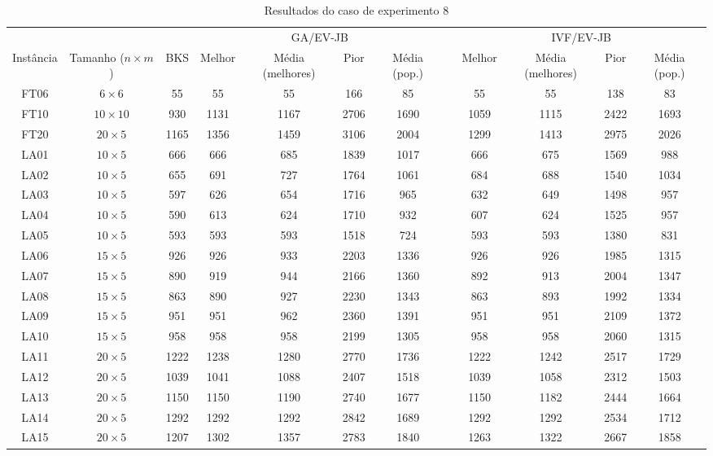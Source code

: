 \begin{sidewaystable}
\caption{Resultados do caso de experimento 8}
\centering
\label{experimento8}
\begin{tabular}{cccccccccccc}
\toprule
& & & \multicolumn{4}{c}{GA/EV-JB} & & \multicolumn{4}{c}{IVF/EV-JB} \\
\cmidrule(c){4-7}
\cmidrule(c){9-12}
Inst\^{a}ncia & Tamanho ($n \times m$) & BKS & Melhor & M\'{e}dia (melhores) & Pior & M\'{e}dia (pop.) & & Melhor & M\'{e}dia (melhores) & Pior & M\'{e}dia (pop.) \\
\midrule
FT06 & $6 \times 6$ & 55 & 55 & 55 & 166 & 85 & & 55 & 55 & 138 & 83 \\
FT10 & $10 \times 10$ & 930 & 1131 & 1167 & 2706 & 1690 & & 1059 & 1115 & 2422 & 1693 \\
FT20 & $20 \times 5$ & 1165 & 1356 & 1459 & 3106 & 2004 & & 1299 & 1413 & 2975 & 2026 \\
LA01 & $10 \times 5$ & 666 & 666 & 685 & 1839 & 1017 & & 666 & 675 & 1569 & 988 \\
LA02 & $10 \times 5$ & 655 & 691 & 727 & 1764 & 1061 & & 684 & 688 & 1540 & 1034 \\
LA03 & $10 \times 5$ & 597 & 626 & 654 & 1716 & 965 & & 632 & 649 & 1498 & 957 \\
LA04 & $10 \times 5$ & 590 & 613 & 624 & 1710 & 932 & & 607 & 624 & 1525 & 957 \\
LA05 & $10 \times 5$ & 593 & 593 & 593 & 1518 & 724 & & 593 & 593 & 1380 & 831 \\
LA06 & $15 \times 5$ & 926 & 926 & 933 & 2203 & 1336 & & 926 & 926 & 1985 & 1315 \\
LA07 & $15 \times 5$ & 890 & 919 & 944 & 2166 & 1360 & & 892 & 913 & 2004 & 1347 \\
LA08 & $15 \times 5$ & 863 & 890 & 927 & 2230 & 1343 & & 863 & 893 & 1992 & 1334 \\
LA09 & $15 \times 5$ & 951 & 951 & 962 & 2360 & 1391 & & 951 & 951 & 2109 & 1372 \\
LA10 & $15 \times 5$ & 958 & 958 & 958 & 2199 & 1305 & & 958 & 958 & 2060 & 1315 \\
LA11 & $20 \times 5$ & 1222 & 1238 & 1280 & 2770 & 1736 & & 1222 & 1242 & 2517 & 1729 \\
LA12 & $20 \times 5$ & 1039 & 1041 & 1088 & 2407 & 1518 & & 1039 & 1058 & 2312 & 1503 \\
LA13 & $20 \times 5$ & 1150 & 1150 & 1190 & 2740 & 1677 & & 1150 & 1182 & 2444 & 1664 \\
LA14 & $20 \times 5$ & 1292 & 1292 & 1292 & 2842 & 1689 & & 1292 & 1292 & 2534 & 1712 \\
LA15 & $20 \times 5$ & 1207 & 1302 & 1357 & 2783 & 1840 & & 1263 & 1322 & 2667 & 1858 \\
\bottomrule
\end{tabular}
\end{sidewaystable}
